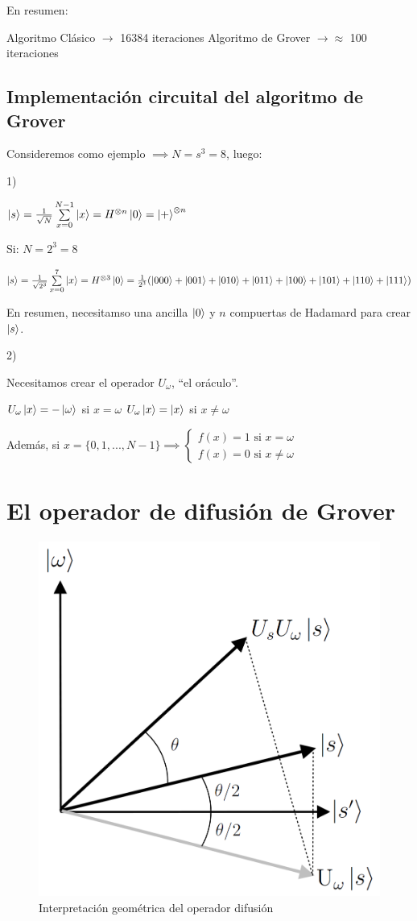 \documentclass[11pt, spanish]{report}
\begin{document}
En resumen:

Algoritmo Clásico $\rightarrow$ 16384 iteraciones
Algoritmo de Grover $\rightarrow \approx$ 100 iteraciones

\subsection{Implementación circuital del algoritmo de Grover}

Consideremos como ejemplo $\implies N = s^3 = 8$, luego:

1)

$\ket{s} = \frac{1}{\sqrt{N}} \sum\limits_{x=0}^{N-1} \ket{x} = H^{\otimes n}
\ket{0} = \ket{+}^{\otimes n}$

Si: $N = 2^3 = 8$

$\ket{s} = \frac{1}{\sqrt{2^3}} \sum\limits_{x=0}^{7} \ket{x} = H^{\otimes 3}
\ket{0} = \frac{1}{2^3} (\ket{000} + \ket{001} + \ket{010} + \ket{011} + \ket{100} + \ket{101} + \ket{110} + \ket{111})$

En resumen, necesitamso una ancilla $\ket{0}$ y $n$ compuertas de Hadamard para
crear $\ket{s}$.

2)

Necesitamos crear el operador $U_\omega$, ``el oráculo''.

$U_\omega \ket{x} = -\ket{\omega}$ si $x = \omega$
$U_\omega \ket{x} = \ket{x}$ si $x \neq \omega$

Además, si $x = \{0, 1, ... , N-1\} \implies \begin{cases} f(x) = 1 \text{ si }
  x = \omega \\ f(x) = 0 \text{ si } x \neq \omega \end{cases}$














\section{El operador de difusión de Grover}

\begin{figure}[H]
\centering \includegraphics[width=0.3\linewidth]{Grover/grover_geometry.png}
\caption{Interpretación geométrica del operador difusión}
\end{figure}
\end{document}
